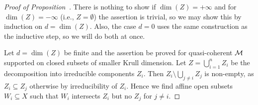 \documentclass[a4paper,parskip=half,numbers=enddot, DIV=12]{scrreprt}
\begin{document}
\begin{proof}[Proof of Proposition~]
There is nothing to show if $\dim(Z)=+ \infty$ and for $\dim(Z)=-\infty$ (i.e., $Z=\emptyset$) the assertion is trivial, so we may show this by induction on $d=\dim(Z)$. Also, the case $d=0$ uses the same construction as the inductive step, so we will do both at once.



Let $d=\dim(Z)$ be finite and the assertion be proved for quasi-coherent $\mathcal{M}$ supported on closed
subsets of smaller Krull dimension. Let $Z=\bigcup_{i=1}^n Z_i$ be the decomposition into irreducible components $Z_i$. Then $Z_i\setminus \bigcup_{j\neq i}Z_j$ is non-empty, as $Z_i\subseteq Z_j$ otherwise by irreducibility of $Z_i$. Hence we find affine open subsets $W_i\subseteq X$ such that $W_i$ intersects $Z_i$ but no $Z_j$ for $j\neq i$.


\end{proof}
\end{document}
